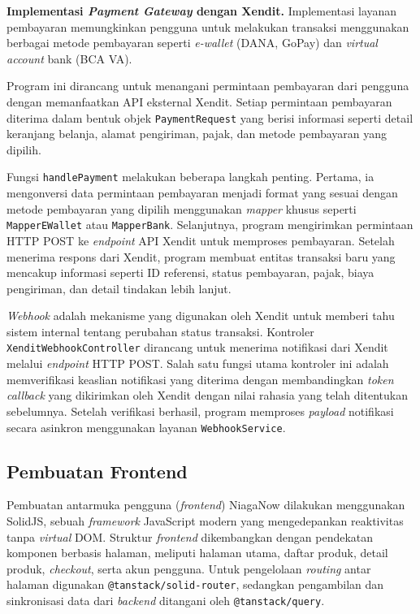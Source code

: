 \documentclass[12pt,a4paper,twocolumn]{article}
\begin{document}
\textbf{Implementasi \textit{Payment Gateway} dengan Xendit.} Implementasi layanan pembayaran memungkinkan pengguna untuk melakukan transaksi menggunakan berbagai metode pembayaran seperti \textit{e-wallet} (DANA, GoPay) dan \textit{virtual account} bank (BCA VA).

Program ini dirancang untuk menangani permintaan pembayaran dari pengguna dengan memanfaatkan API eksternal Xendit. Setiap permintaan pembayaran diterima dalam bentuk objek \texttt{PaymentRequest} yang berisi informasi seperti detail keranjang belanja, alamat pengiriman, pajak, dan metode pembayaran yang dipilih.

Fungsi \texttt{handlePayment} melakukan beberapa langkah penting. Pertama, ia mengonversi data permintaan pembayaran menjadi format yang sesuai dengan metode pembayaran yang dipilih menggunakan \textit{mapper} khusus seperti \texttt{MapperEWallet} atau \texttt{MapperBank}. Selanjutnya, program mengirimkan permintaan HTTP POST ke \textit{endpoint} API Xendit untuk memproses pembayaran. Setelah menerima respons dari Xendit, program membuat entitas transaksi baru yang mencakup informasi seperti ID referensi, status pembayaran, pajak, biaya pengiriman, dan detail tindakan lebih lanjut.

\textit{Webhook} adalah mekanisme yang digunakan oleh Xendit untuk memberi tahu sistem internal tentang perubahan status transaksi. Kontroler \texttt{XenditWebhookController} dirancang untuk menerima notifikasi dari Xendit melalui \textit{endpoint} HTTP POST. Salah satu fungsi utama kontroler ini adalah memverifikasi keaslian notifikasi yang diterima dengan membandingkan \textit{token callback} yang dikirimkan oleh Xendit dengan nilai rahasia yang telah ditentukan sebelumnya. Setelah verifikasi berhasil, program memproses \textit{payload} notifikasi secara asinkron menggunakan layanan \texttt{WebhookService}.

\subsection{Pembuatan Frontend}

Pembuatan antarmuka pengguna (\textit{frontend}) NiagaNow dilakukan menggunakan SolidJS, sebuah \textit{framework} JavaScript modern yang mengedepankan reaktivitas tanpa \textit{virtual} DOM. Struktur \textit{frontend} dikembangkan dengan pendekatan komponen berbasis halaman, meliputi halaman utama, daftar produk, detail produk, \textit{checkout}, serta akun pengguna. Untuk pengelolaan \textit{routing} antar halaman digunakan \texttt{@tanstack/solid-router}, sedangkan pengambilan dan sinkronisasi data dari \textit{backend} ditangani oleh \texttt{@tanstack/query}.
\end{document}
